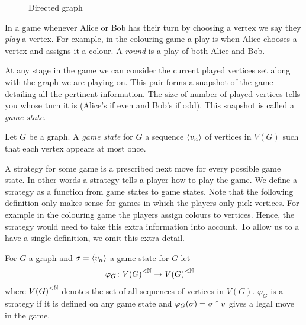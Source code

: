 \begin{figure}[h]
    \centering
    \caption{Directed graph}
    \label{fig:directed_graph}
\end{figure}
   
In a game whenever Alice or Bob has their turn by choosing a vertex we say they \textit{play} a vertex. For example, in the colouring game a play is when Alice chooses a vertex and assigns it a colour. A \textit{round} is a play of both Alice and Bob.

At any stage in the game we can consider the current played vertices set along with the graph we are playing on. This pair forms a snapshot of the game detailing all the pertinent information. The size of number of played vertices tells you whose turn it is (Alice's if even and Bob's if odd). This snapshot is called a \textit{game state}. 

\begin{definition}
    Let $G$ be a graph. A \textit{game state} for $G$ a sequence $\left\langle v_n \right\rangle$ of vertices in $V(G)$ such that each vertex appears at most once.
\end{definition}

A strategy for some game is a prescribed next move for every possible game state. In other words a strategy tells a player how to play the game. We define a strategy as a function from game states to game states. Note that the following definition only makes sense for games in which the players only pick vertices. For example in the colouring game the players assign colours to vertices. Hence, the strategy would need to take this extra information into account. To allow us to a have a single definition, we omit this extra detail.

\begin{definition}[Strategy]
    For $G$ a graph and $\sigma=\left\langle v_n \right\rangle$ a game state for $G$ let
    \begin{align*}        
    \varphi_G &\colon {V(G)}^{<\mathbb{N}} \to {V(G)}^{<\mathbb{N}} 
    \end{align*}
    where ${V(G)}^{<\mathbb{N}}$ denotes the set of all sequences of vertices in $V(G)$. $\varphi_G$ is a strategy if it is defined on any game state and $\varphi_G(\sigma)=\sigma\caret v$ gives a legal move in the game. 
\end{definition}
    
